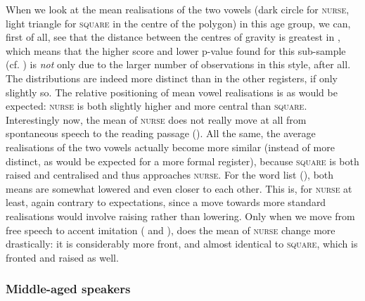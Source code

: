 \largerpage
When we look at the mean realisations of the two vowels (dark circle for \textsc{nurse}, light triangle for \textsc{square} in the centre of the polygon) in this age group, we can, first of all, see that the distance between the centres of gravity is greatest in , which means that the higher  score and lower p-value found for this sub-sample (cf. ) is \emph{not} only due to the larger number of observations in this style, after all.
The distributions are indeed more distinct than in the other registers, if only slightly so.
The relative positioning of mean vowel realisations is as would be expected: \textsc{nurse} is both slightly higher and more central than \textsc{square}.
Interestingly now, the mean of \textsc{nurse} does not really move at all from spontaneous speech to the reading passage ().
All the same, the average realisations of the two vowels actually become more similar (instead of more distinct, as would be expected for a more formal register), because \textsc{square} is both raised and centralised and thus approaches \textsc{nurse}.
For the word list (), both means are somewhat lowered and even closer to each other.
This is, for \textsc{nurse} at least, again contrary to expectations, since a move towards more standard realisations would involve raising rather than lowering.
Only when we move from free speech to accent imitation ( and ), does the mean of \textsc{nurse} change more drastically: it is considerably more front, and almost identical to \textsc{square}, which is fronted and raised as well.

\subsubsection{Middle-aged speakers}

